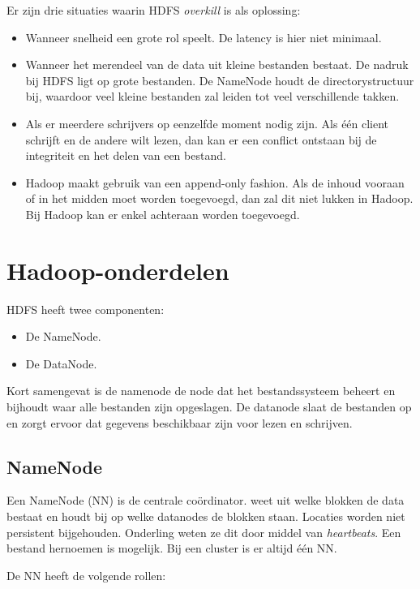 \documentclass[a4paper,10pt,twoside]{report}
\begin{document}
Er zijn drie situaties waarin HDFS \textit{overkill} is als oplossing:

\begin{itemize}
	\item Wanneer snelheid een grote rol speelt. De latency is hier niet minimaal.
	\item Wanneer het merendeel van de data uit kleine bestanden bestaat. De nadruk bij HDFS ligt op grote bestanden. De NameNode houdt de directorystructuur bij, waardoor veel kleine bestanden zal leiden tot veel verschillende takken.
	\item Als er meerdere schrijvers op eenzelfde moment nodig zijn. Als één client schrijft en de andere wilt lezen, dan kan er een conflict ontstaan bij de integriteit en het delen van een bestand.
	\item Hadoop maakt gebruik van een append-only fashion. Als de inhoud vooraan of in het midden moet worden toegevoegd, dan zal dit niet lukken in Hadoop. Bij Hadoop kan er enkel achteraan worden toegevoegd.
\end{itemize}


\section{Hadoop-onderdelen}

HDFS heeft twee componenten:

\begin{itemize}
	\item De NameNode.
	\item De DataNode.
\end{itemize}

Kort samengevat is de namenode de node dat het bestandssysteem beheert en bijhoudt waar alle bestanden zijn opgeslagen. De datanode slaat de bestanden op en zorgt ervoor dat gegevens beschikbaar zijn voor lezen en schrijven.

\subsection{NameNode}

Een NameNode (NN) is de centrale coördinator. weet uit welke blokken de data bestaat en houdt bij op welke datanodes de blokken staan. Locaties worden niet persistent bijgehouden. Onderling weten ze dit door middel van \textit{heartbeats}.  Een bestand hernoemen is mogelijk. Bij een cluster is er altijd één NN.

De NN heeft de volgende rollen:
\end{document}
